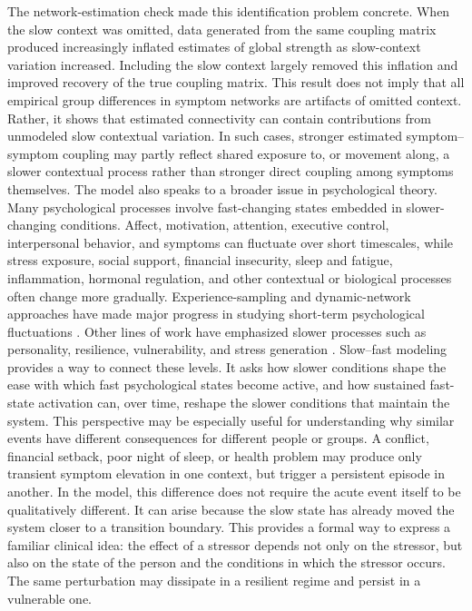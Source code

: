 \documentclass[man,12pt,floatsintext]{apa7}
\begin{document}
The network-estimation check made this identification problem concrete. When the slow context was omitted, data generated from the same coupling matrix produced increasingly inflated estimates of global strength as slow-context variation increased. Including the slow context largely removed this inflation and improved recovery of the true coupling matrix. This result does not imply that all empirical group differences in symptom networks are artifacts of omitted context. Rather, it shows that estimated connectivity can contain contributions from unmodeled slow contextual variation. In such cases, stronger estimated symptom--symptom coupling may partly reflect shared exposure to, or movement along, a slower contextual process rather than stronger direct coupling among symptoms themselves.
The model also speaks to a broader issue in psychological theory. Many psychological processes involve fast-changing states embedded in slower-changing conditions. Affect, motivation, attention, executive control, interpersonal behavior, and symptoms can fluctuate over short timescales, while stress exposure, social support, financial insecurity, sleep and fatigue, inflammation, hormonal regulation, and other contextual or biological processes often change more gradually. Experience-sampling and dynamic-network approaches have made major progress in studying short-term psychological fluctuations \parencite{myin2009experience, wichers2014dynamic, bringmann2013network}. Other lines of work have emphasized slower processes such as personality, resilience, vulnerability, and stress generation \parencite{lunansky2020personality, hammen2006stress, liu2010stress, rnic2023vicious}. Slow--fast modeling provides a way to connect these levels. It asks how slower conditions shape the ease with which fast psychological states become active, and how sustained fast-state activation can, over time, reshape the slower conditions that maintain the system.
This perspective may be especially useful for understanding why similar events have different consequences for different people or groups. A conflict, financial setback, poor night of sleep, or health problem may produce only transient symptom elevation in one context, but trigger a persistent episode in another. In the model, this difference does not require the acute event itself to be qualitatively different. It can arise because the slow state has already moved the system closer to a transition boundary. This provides a formal way to express a familiar clinical idea: the effect of a stressor depends not only on the stressor, but also on the state of the person and the conditions in which the stressor occurs. The same perturbation may dissipate in a resilient regime and persist in a vulnerable one.
\end{document}
